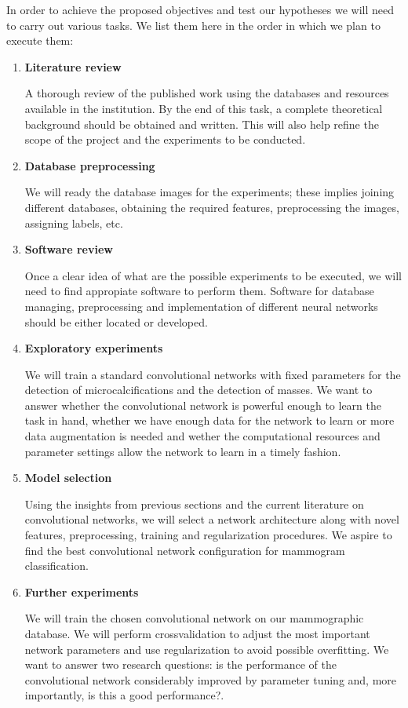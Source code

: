 In order to achieve the proposed objectives and test our hypotheses we will need to carry out various tasks. We list them here in the order in which we plan to execute them:

\begin{enumerate}
	\item \textbf{Literature review}

A thorough review of the published work using the databases and resources available in the institution. By the end of this task, a complete theoretical background should be obtained and written. This will also help refine the scope of the project and the experiments to be conducted.
	\item \textbf{Database preprocessing}

We will ready the database images for the experiments; these implies joining different databases, obtaining the required features, preprocessing the images, assigning labels, etc.	
	\item \textbf{Software review}

Once a clear idea of what are the possible experiments to be executed, we will need to find appropiate software to perform them. Software for database managing, preprocessing and implementation of different neural networks should be either located or developed.
	\item \textbf{Exploratory experiments}

We will train a standard convolutional networks with fixed parameters for the detection of microcalcifications and the detection of masses. We want to answer whether the convolutional network is powerful enough to learn the task in hand, whether we have enough data for the network to learn or more data augmentation is needed and wether the computational resources and parameter settings allow the network to learn in a timely fashion.
	\item \textbf{Model selection}

Using the insights from previous sections and the current literature on convolutional networks, we will select a network architecture along with novel features, preprocessing, training and regularization procedures. We aspire to find the best convolutional network configuration for mammogram classification.
	\item \textbf{Further experiments}

We will train the chosen convolutional network on our mammographic database. We will perform crossvalidation to adjust the most important network parameters and use regularization to avoid possible overfitting. We want to answer two research questions: is the performance of the convolutional network considerably improved by parameter tuning and, more importantly, is this a good performance?.


\end{enumerate}
